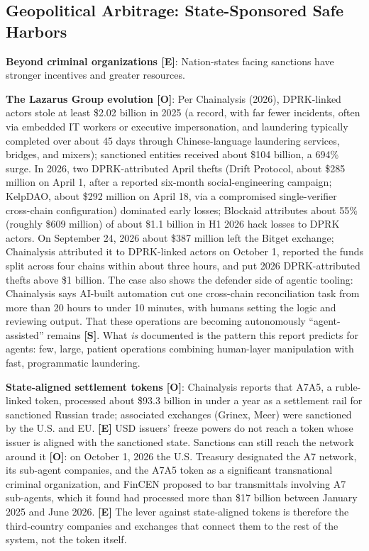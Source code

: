 \documentclass[11pt,letterpaper]{article}
\begin{document}
\subsection{Geopolitical Arbitrage: State-Sponsored Safe Harbors}

\textbf{Beyond criminal organizations [E]}: Nation-states facing sanctions have stronger incentives and greater resources.

\textbf{The Lazarus Group evolution [O]}: Per Chainalysis (2026), DPRK-linked actors stole at least \$2.02 billion in 2025 (a record, with far fewer incidents, often via embedded IT workers or executive impersonation, and laundering typically completed over about 45 days through Chinese-language laundering services, bridges, and mixers); sanctioned entities received about \$104 billion, a 694\% surge. In 2026, two DPRK-attributed April thefts (Drift Protocol, about \$285 million on April 1, after a reported six-month social-engineering campaign; KelpDAO, about \$292 million on April 18, via a compromised single-verifier cross-chain configuration) dominated early losses; Blockaid attributes about 55\% (roughly \$609 million) of about \$1.1 billion in H1 2026 hack losses to DPRK actors. On September 24, 2026 about \$387 million left the Bitget exchange; Chainalysis attributed it to DPRK-linked actors on October 1, reported the funds split across four chains within about three hours, and put 2026 DPRK-attributed thefts above \$1 billion. The case also shows the defender side of agentic tooling: Chainalysis says AI-built automation cut one cross-chain reconciliation task from more than 20 hours to under 10 minutes, with humans setting the logic and reviewing output. That these operations are becoming autonomously ``agent-assisted'' remains \textbf{[S]}. What \textit{is} documented is the pattern this report predicts for agents: few, large, patient operations combining human-layer manipulation with fast, programmatic laundering.

\textbf{State-aligned settlement tokens [O]}: Chainalysis reports that A7A5, a ruble-linked token, processed about \$93.3 billion in under a year as a settlement rail for sanctioned Russian trade; associated exchanges (Grinex, Meer) were sanctioned by the U.S. and EU. \textbf{[E]} USD issuers' freeze powers do not reach a token whose issuer is aligned with the sanctioned state. Sanctions can still reach the network around it \textbf{[O]}: on October 1, 2026 the U.S. Treasury designated the A7 network, its sub-agent companies, and the A7A5 token as a significant transnational criminal organization, and FinCEN proposed to bar transmittals involving A7 sub-agents, which it found had processed more than \$17 billion between January 2025 and June 2026. \textbf{[E]} The lever against state-aligned tokens is therefore the third-country companies and exchanges that connect them to the rest of the system, not the token itself.
\end{document}
